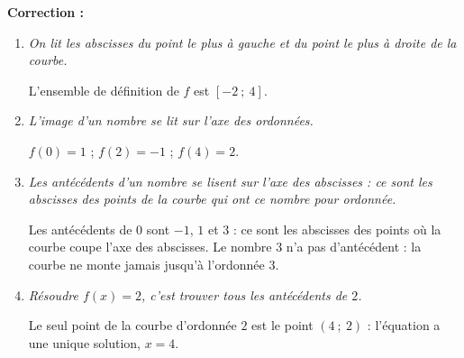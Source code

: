 \documentclass[10pt,a4paper]{article}
\begin{document}
\begin{bloc}
\textbf{Correction :}
\begin{enumerate}[leftmargin=*]
    \item \textit{On lit les abscisses du point le plus à gauche et du point le plus à droite de la courbe.}

    L'ensemble de définition de \(f\) est \([-2\ ;\ 4]\).
    \item \textit{L'image d'un nombre se lit sur l'axe des ordonnées.}

    \(f(0)=1\) ; \(f(2)=-1\) ; \(f(4)=2\).
    \item \textit{Les antécédents d'un nombre se lisent sur l'axe des abscisses : ce sont les abscisses des points de la courbe qui ont ce nombre pour ordonnée.}

    Les antécédents de \(0\) sont \(-1\), \(1\) et \(3\) : ce sont les abscisses des points où la courbe coupe l'axe des abscisses. Le nombre \(3\) n'a pas d'antécédent : la courbe ne monte jamais jusqu'à l'ordonnée \(3\).
    \item \textit{Résoudre \(f(x)=2\), c'est trouver tous les antécédents de \(2\).}

    Le seul point de la courbe d'ordonnée \(2\) est le point \((4\ ;\ 2)\) : l'équation a une unique solution, \(x=4\).
\end{enumerate}
\end{bloc}
\end{document}
